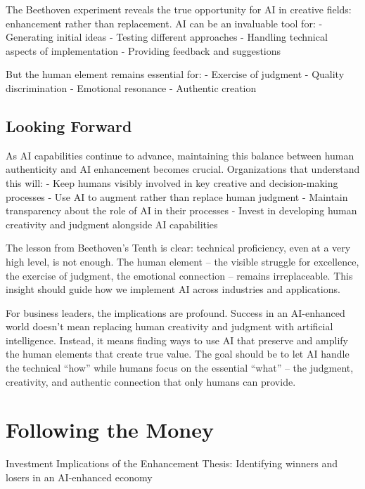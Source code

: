 \documentclass[
  Letterpaper,
]{scrbook}
\begin{document}
The Beethoven experiment reveals the true opportunity for AI in creative
fields: enhancement rather than replacement. AI can be an invaluable
tool for: - Generating initial ideas - Testing different approaches -
Handling technical aspects of implementation - Providing feedback and
suggestions

But the human element remains essential for: - Exercise of judgment -
Quality discrimination - Emotional resonance - Authentic creation

\section{Looking Forward}\label{looking-forward-1}

As AI capabilities continue to advance, maintaining this balance between
human authenticity and AI enhancement becomes crucial. Organizations
that understand this will: - Keep humans visibly involved in key
creative and decision-making processes - Use AI to augment rather than
replace human judgment - Maintain transparency about the role of AI in
their processes - Invest in developing human creativity and judgment
alongside AI capabilities

The lesson from Beethoven's Tenth is clear: technical proficiency, even
at a very high level, is not enough. The human element -- the visible
struggle for excellence, the exercise of judgment, the emotional
connection -- remains irreplaceable. This insight should guide how we
implement AI across industries and applications.

For business leaders, the implications are profound. Success in an
AI-enhanced world doesn't mean replacing human creativity and judgment
with artificial intelligence. Instead, it means finding ways to use AI
that preserve and amplify the human elements that create true value. The
goal should be to let AI handle the technical ``how'' while humans focus
on the essential ``what'' -- the judgment, creativity, and authentic
connection that only humans can provide.


\chapter{Following the Money}\label{following-the-money}

Investment Implications of the Enhancement Thesis: Identifying winners
and losers in an AI-enhanced economy

\hfill\break
\end{document}
